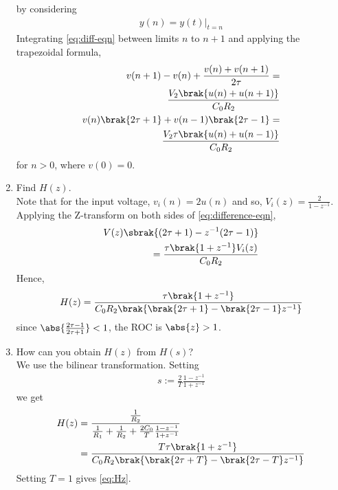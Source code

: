\documentclass[journal,12pt,twocolumn]{IEEEtran}
\renewcommand\thesection{\arabic{section}}
\begin{document}
\begin{enumerate}[label=\arabic*.,ref=\thesection.\theenumi]
by considering
\begin{align}
y(n) = y(t)\vert_{t=n}
\end{align}
\solution
Integrating \eqref{eq:diff-eqn} between limits $n$ to $n+1$
and applying the trapezoidal formula,
\begin{align}
v(n+1) - v(n) + \frac{v(n) + v(n+1)}{2\tau} = \nonumber\\
\frac{V_2\brak{u(n)+u(n+1)}}{C_0R_2} \\
v(n)\brak{2\tau+1} + v(n-1)\brak{2\tau-1} = \nonumber\\
\frac{V_2\tau\brak{u(n)+u(n-1)}}{C_0R_2}
\label{eq:difference-eqn}
\end{align}
for $n > 0$, where $v(0) = 0$.
\item Find $H(z)$. \\
\solution Note that for the input voltage, $v_i(n) = 2u(n)$ and
so, $V_i(z) = \frac{2}{1-z^{-1}}$. Applying the Z-transform
on both sides of \eqref{eq:difference-eqn},
\begin{align}
V(z)\sbrak{(2\tau + 1) - z^{-1}(2\tau - 1)} \nonumber \\
= \frac{\tau\brak{1 + z^{-1}}V_i(z)}{C_0R_2}
\end{align}
Hence,
\begin{align}
H(z) = \frac{\tau\brak{1+z^{-1}}}{C_0R_2\brak{\brak{2\tau+1}-\brak{2\tau-1}z^{-1}}}
\label{eq:Hz}
\end{align}
since $\abs{\frac{2\tau-1}{2\tau+1}} < 1$, the ROC is $\abs{z} > 1$.
\\
\item How can you obtain $H(z)$ from $H(s)$? \\
\solution We use the bilinear transformation. Setting
\begin{align}
s := \frac{2}{T}\frac{1 - z^{-1}}{1 + z^{-1}}
\end{align}
we get
\begin{align}
H(z) &= \frac{\frac{1}{R_2}}{\frac{1}{R_1} + \frac{1}{R_2} + \frac{2C_0}{T}\frac{1 - z^{-1}}{1 + z^{-1}}} \\
&= \frac{T\tau\brak{1+z^{-1}}}{C_0R_2\brak{\brak{2\tau+T}-\brak{2\tau-T}z^{-1}}}
\end{align}
Setting $T = 1$ gives \eqref{eq:Hz}.
\end{enumerate}
\end{document}
